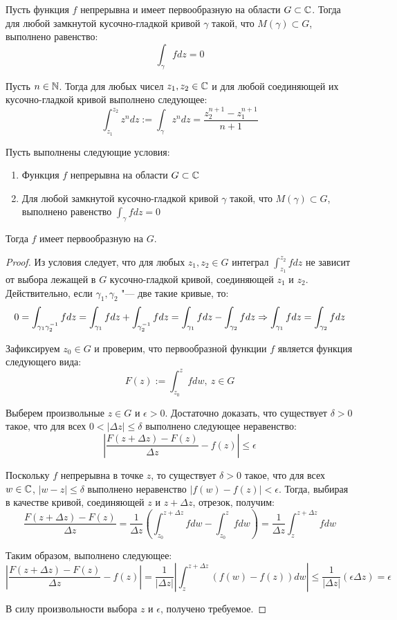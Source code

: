\begin{corollary}
	Пусть функция $f$ непрерывна и имеет первообразную на области $G \subset \mathbb{C}$. Тогда для любой замкнутой кусочно-гладкой кривой $\gamma$ такой, что $M(\gamma) \subset G$, выполнено равенство:
	\[\int_\gamma fdz = 0\]
\end{corollary}

\begin{example}
	Пусть $n \in \mathbb{N}$. Тогда для любых чисел $z_1, z_2 \in \mathbb{C}$ и для любой соединяющей их кусочно-гладкой кривой выполнено следующее:
	\[\int_{z_1}^{z_2}z^ndz := \int_\gamma z^ndz = \frac{z_2^{n+1} - z_1^{n+1}}{n+1}\]
\end{example}

\begin{proposition}
	Пусть выполнены следующие условия:
	\begin{enumerate}
		\item Функция $f$ непрерывна на области $G \subset \mathbb{C}$
		\item Для любой замкнутой кусочно-гладкой кривой $\gamma$ такой, что $M(\gamma) \subset G$, выполнено равенство $\int_\gamma fdz = 0$
	\end{enumerate}

	Тогда $f$ имеет первообразную на $G$.
\end{proposition}
\pagebreak

\begin{proof}
	Из условия следует, что для любых $z_1, z_2 \in G$ интеграл $\int_{z_1}^{z_2} fdz$ не зависит от выбора лежащей в $G$ кусочно-гладкой кривой, соединяющей $z_1$ и $z_2$. Действительно, если $\gamma_1, \gamma_2$ "--- две такие кривые, то:
	\[0 = \int_{\gamma_1\gamma_2^{-1}}fdz = \int_{\gamma_1}fdz + \int_{\gamma_2^{-1}}fdz = \int_{\gamma_1}fdz - \int_{\gamma_2}fdz \Rightarrow \int_{\gamma_1}fdz = \int_{\gamma_2}fdz\]
	
	Зафиксируем $z_0 \in G$ и проверим, что первообразной функции $f$ является функция следующего вида:
	\[F(z) := \int_{z_0}^zfdw,~z \in G\]
	
	Выберем произвольные $z \in G$ и $\epsilon > 0$. Достаточно доказать, что существует $\delta > 0$ такое, что для всех $0 < |\Delta z| \le \delta$ выполнено следующее неравенство:
	\[\left|\frac{F(z + \Delta z) - F(z)}{\Delta z} - f(z)\right| \le \epsilon\]
	
	Поскольку $f$ непрерывна в точке $z$, то существует $\delta > 0$ такое, что для всех $w \in \mathbb{C}$, $|w - z| \le \delta$ выполнено неравенство $|f(w) - f(z)| < \epsilon$. Тогда, выбирая в качестве кривой, соединяющей $z$ и $z + \Delta z$, отрезок, получим:
	\[\frac{F(z + \Delta z) - F(z)}{\Delta z} = \frac{1}{\Delta z}\left(\int_{z_0}^{z + \Delta z}fdw - \int_{z_0}^{z}fdw\right) = \frac{1}{\Delta z}\int_{z}^{z + \Delta z}fdw\]
	
	Таким образом, выполнено следующее:
	\[\left|\frac{F(z + \Delta z) - F(z)}{\Delta z} - f(z)\right| = \frac1{|\Delta z|}\left|\int_z^{z + \Delta z}\left(f(w) - f(z)\right)dw\right| \le \frac1{|\Delta z|}(\epsilon\Delta z) = \epsilon\]
	
	В силу произвольности выбора $z$ и $\epsilon$, получено требуемое.
\end{proof}

